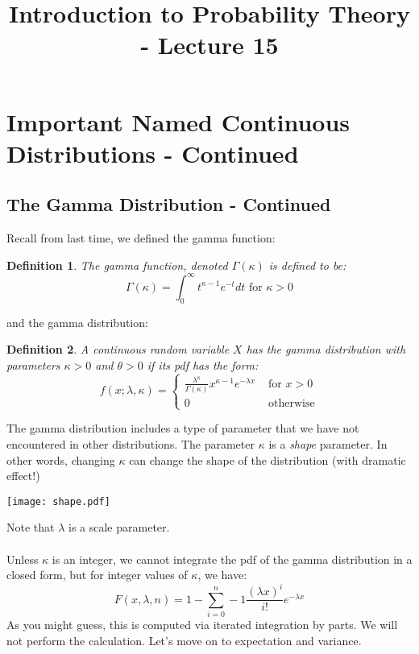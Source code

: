 \documentclass[12pt]{article} %
\date{}
\title{Introduction to Probability Theory - Lecture 15}
\newtheorem{defn}{Definition}
\begin{document}
\maketitle

\section{Important Named Continuous Distributions - Continued}
\subsection{The Gamma Distribution - Continued}
Recall from last time, we defined the gamma function: 
\begin{defn}
The gamma function, denoted $\Gamma(\kappa)$ is defined to be:
$$\Gamma(\kappa) = \int_0^{\infty} t^{\kappa -1} e^{-t} dt \textrm{ for } \kappa >0$$
\end{defn}
and the gamma distribution:
\begin{defn}
A continuous random variable $X$ has the gamma distribution with parameters $\kappa>0$ and $\theta>0$ if its pdf has the form:
$$f(x;\lambda,\kappa) = \left\{\begin{matrix}
\frac{\lambda^\kappa}{\Gamma(\kappa)}x^{\kappa-1} e^{-\lambda x} & \textrm{ for } x>0\\0&\textrm{ otherwise}\end{matrix}\right.$$
\end{defn}
The gamma distribution includes a type of parameter that we have not encountered in other distributions. The parameter $\kappa$ is a \emph{shape} parameter. In other words, changing $\kappa$ can change the shape of the distribution (with dramatic effect!)

\texttt{[image: shape.pdf]}

Note that $\lambda$ is a scale parameter.\\\\
Unless $\kappa$ is an integer, we cannot integrate the pdf of the gamma distribution in a closed form, but for integer values of $\kappa$, we have:
$$F(x,\lambda,n) = 1-\sum_{i=0}^n-1 \frac{\left(\lambda x\right)^i}{i!} e^{-\lambda x}$$
As you might guess, this is computed via iterated integration by parts. We will not perform the calculation. Let's move on to expectation and variance.
\end{document}
